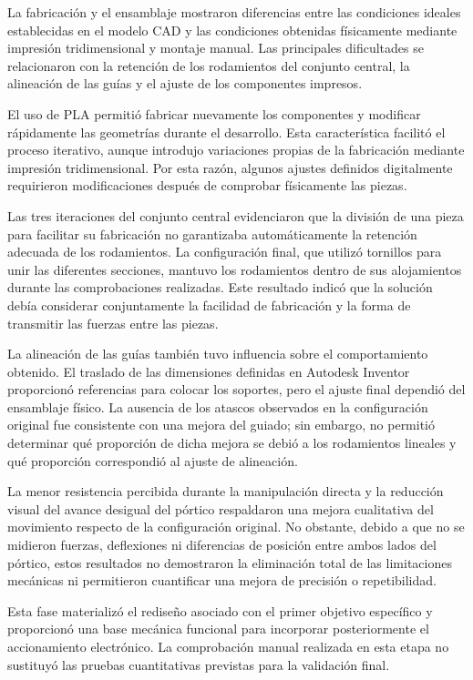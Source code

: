 La fabricación y el ensamblaje mostraron diferencias entre las condiciones ideales establecidas en el modelo CAD y las condiciones obtenidas físicamente mediante impresión tridimensional y montaje manual. Las principales dificultades se relacionaron con la retención de los rodamientos del conjunto central, la alineación de las guías y el ajuste de los componentes impresos.

El uso de PLA permitió fabricar nuevamente los componentes y modificar rápidamente las geometrías durante el desarrollo. Esta característica facilitó el proceso iterativo, aunque introdujo variaciones propias de la fabricación mediante impresión tridimensional. Por esta razón, algunos ajustes definidos digitalmente requirieron modificaciones después de comprobar físicamente las piezas.

Las tres iteraciones del conjunto central evidenciaron que la división de una pieza para facilitar su fabricación no garantizaba automáticamente la retención adecuada de los rodamientos. La configuración final, que utilizó tornillos para unir las diferentes secciones, mantuvo los rodamientos dentro de sus alojamientos durante las comprobaciones realizadas. Este resultado indicó que la solución debía considerar conjuntamente la facilidad de fabricación y la forma de transmitir las fuerzas entre las piezas.

La alineación de las guías también tuvo influencia sobre el comportamiento obtenido. El traslado de las dimensiones definidas en Autodesk Inventor proporcionó referencias para colocar los soportes, pero el ajuste final dependió del ensamblaje físico. La ausencia de los atascos observados en la configuración original fue consistente con una mejora del guiado; sin embargo, no permitió determinar qué proporción de dicha mejora se debió a los rodamientos lineales y qué proporción correspondió al ajuste de alineación.

La menor resistencia percibida durante la manipulación directa y la reducción visual del avance desigual del pórtico respaldaron una mejora cualitativa del movimiento respecto de la configuración original. No obstante, debido a que no se midieron fuerzas, deflexiones ni diferencias de posición entre ambos lados del pórtico, estos resultados no demostraron la eliminación total de las limitaciones mecánicas ni permitieron cuantificar una mejora de precisión o repetibilidad.

Esta fase materializó el rediseño asociado con el primer objetivo específico y proporcionó una base mecánica funcional para incorporar posteriormente el accionamiento electrónico. La comprobación manual realizada en esta etapa no sustituyó las pruebas cuantitativas previstas para la validación final.


